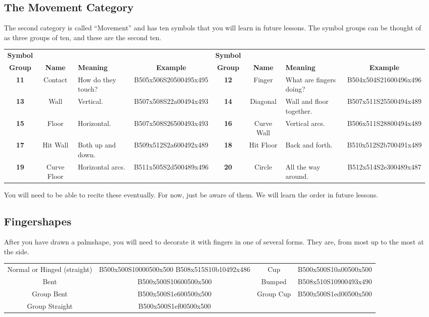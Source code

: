 \documentclass{article}
\begin{document}
\subsection{The Movement Category}

The second category is called ``Movement'' and has ten symbols that you will learn in future lessons.
The symbol groups can be thought of as three groups of ten, and these are the second ten.

\begin{center}
\begin{tabular}{ccp{21mm}c@{\hskip 5mm}ccp{21mm}c}
\textbf{Symbol}&&&&\textbf{Symbol}\\
\textbf{Group}&\textbf{Name}&\textbf{Meaning}&\textbf{Example}&\textbf{Group}&\textbf{Name}&\textbf{Meaning}&\textbf{Example}\\
\textbf{11}&Contact    &How do they touch?&B505x506S20500495x495&\textbf{12}&Finger    &What are fingers doing? &B504x504S21600496x496\\
\textbf{13}&Wall       &Vertical.         &B507x508S22a00494x493&\textbf{14}&Diagonal  &Wall and floor together.&B507x511S25500494x489\\
\textbf{15}&Floor      &Horizontal.       &B507x508S26500493x493&\textbf{16}&Curve Wall&Vertical arcs.          &B506x511S28800494x489\\
\textbf{17}&Hit Wall   &Both up and down. &B509x512S2a600492x489&\textbf{18}&Hit Floor &Back and forth.         &B510x512S2b700491x489\\
\textbf{19}&Curve Floor&Horizontal arcs.  &B511x505S2d500489x496&\textbf{20}&Circle    &All the way around.     &B512x514S2e300489x487\\
\end{tabular}
\end{center}

You will need to be able to recite these eventually.
For now, just be aware of them.
We will learn the order in future lessons.

\subsection{Fingershapes}

After you have drawn a palmshape, you will need to decorate it with fingers in one of several forms.
They are, from most up to the most at the side.

\begin{center}
\begin{tabular}{cccc}
Normal or Hinged (straight)&B500x500S10000500x500 B508x515S10b10492x486&Cup      &B500x500S10a00500x500\\
Bent                       &B500x500S10600500x500                      &Bumped   &B508x510S10900493x490\\
Group Bent                 &B500x500S1e600500x500                      &Group Cup&B500x500S1ed00500x500\\
Group Straight             &B500x500S1ef00500x500\\
\end{tabular}
\end{center}
\end{document}
